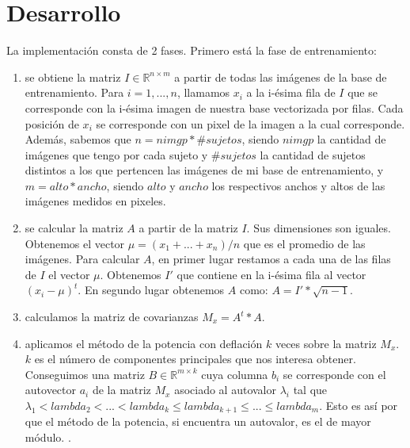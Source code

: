 \section{Desarrollo}
La implementación consta de 2 fases. Primero está la fase de entrenamiento:
\begin{enumerate}
 \item se obtiene la matriz $I\in\mathbb{R}^{n \times m}$ a partir de todas las imágenes de la base de entrenamiento. Para $i = 1,...,n$, llamamos $x_i$ a
 la i-ésima fila de $I$ que se corresponde con la i-ésima imagen de nuestra base vectorizada por filas. Cada posición de $x_i$ se 
 corresponde con un pixel de la imagen a la cual corresponde. Además, sabemos que $n = nimgp * \#sujetos$, siendo $nimgp$ la cantidad de imágenes
 que tengo por cada sujeto y $\#sujetos$ la cantidad de sujetos distintos a los que pertencen las imágenes de mi base de entrenamiento, y 
 $m = alto * ancho$, siendo $alto$ y $ancho$ los respectivos anchos y altos de las imágenes medidos en pixeles.
 
 \item se calcular la matriz $A$ a partir de la matriz $I$. Sus dimensiones son iguales. Obtenemos el vector $\mu = (x_1+...+x_n)/n$ que es 
 el promedio de las imágenes. Para calcular $A$, en primer lugar restamos a cada una de las filas de $I$ el vector $\mu$. Obtenemos $I'$ que contiene en la
 i-ésima fila al vector $(x_i - \mu)^t$. En segundo lugar obtenemos $A$ como: $A = I' * \sqrt{n-1}$.
 
 \item calculamos la matriz de covarianzas $M_x = A^t*A$.
 
 \item aplicamos el método de la potencia con deflación $k$ veces sobre la matriz $M_x$. $k$ es el número de componentes principales que nos 
 interesa obtener. Conseguimos una matriz $B\in\mathbb{R}^{m \times k}$ cuya columna $b_i$ se corresponde con el autovector $a_i$ de la matriz
 $M_x$ asociado al autovalor $\lambda_i$ tal que $\lambda_1 < lambda_2 < ... < lambda_k \leq lambda_{k+1} \leq ... \leq lambda_m$. Esto es así
 por que el método de la potencia, si encuentra un autovalor, es el de mayor módulo. \cite[1]{burden}.
 

\end{enumerate}
